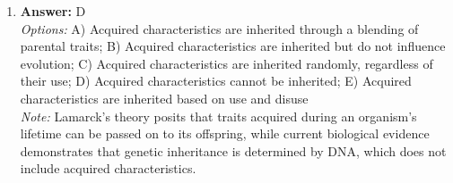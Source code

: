 \documentclass[12pt]{article}
\begin{document}
\begin{enumerate}[label=\arabic*.]
\\ \textit{Note:} Temperature, humidity, and air currents directly influence the water vapor concentration gradient between the leaf interior and the surrounding environment, thereby affecting the rate at which water evaporates from plant surfaces during transpiration.
\item \textbf{Answer:} D
\\ \textit{Options:} A) Acquired characteristics are inherited through a blending of parental traits; B) Acquired characteristics are inherited but do not influence evolution; C) Acquired characteristics are inherited randomly, regardless of their use; D) Acquired characteristics cannot be inherited; E) Acquired characteristics are inherited based on use and disuse
\\ \textit{Note:} Lamarck's theory posits that traits acquired during an organism's lifetime can be passed on to its offspring, while current biological evidence demonstrates that genetic inheritance is determined by DNA, which does not include acquired characteristics.
\end{enumerate}
\end{document}
